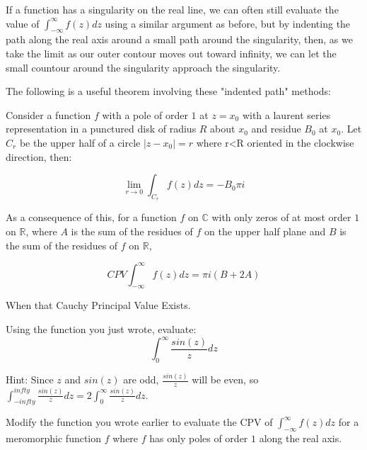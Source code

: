 If a function has a singularity on the real line, we can often still evaluate the value of $\int_{-\infty}^{\infty} f(z) dz$ using a similar argument as before, but by indenting the path along the real axis around a small path around the singularity, then, as we take the limit as our outer contour moves out toward infinity, we can let the small countour around the singularity approach the singularity.

The following is a useful theorem involving these "indented path" methods:

Consider a function $f$ with a pole of order $1$ at $z=x_0$ with a laurent series representation in a punctured disk of radius $R$ about $x_0$ and residue $B_0$ at $x_0$. Let $C_r$ be the upper half of a circle $|z-x_0|=r$ where r<R oriented in the clockwise direction, then:

$$\lim_{r\to 0} \int_{C_r} f(z) dz = - B_0 \pi i$$

As a consequence of this, for a function $f$ on $\mathbb{C}$ with only zeros of at most order $1$ on $\mathbb{R}$, where $A$ is the sum of the residues of $f$ on the upper half plane and $B$ is the sum of the residues of $f$ on $\mathbb{R}$, 

$$CPV \int_{-\infty}^{\infty} f(z) dz = \pi i (B+2A)$$ 

When that Cauchy Principal Value Exists.

\begin{problem}
Using the function you just wrote, evaluate:
$$\int_{0}^{\infty} \frac{sin(z)}{z} dz$$

Hint: Since $z$ and $sin(z)$ are odd, $\frac{sin(z)}{z}$ will be even, so 
$\int_{-infty}^{infty} \frac{sin(z)}{z} dz = 2 \int_{0}^{\infty} \frac{sin(z)}{z} dz$.
\end{problem}


\begin{problem}

Modify the function you wrote earlier to evaluate the CPV of $\int_{-\infty}^{\infty} f(z) dz$ for a meromorphic function $f$ where $f$ has only poles of order $1$ along the real axis.

\end{problem}